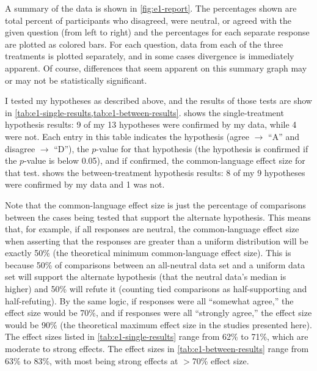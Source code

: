 \begin{table}[!p]
\centering
\bgroup
\def\arraystretch{1.3}
\setlength{\tabcolsep}{0.7em}

\egroup
\caption[Prospective between-treatment results]{%
Between-treatments results.
%
Each row indicates a hypothesis, the corresponding $p$-value, and the effect size if the result is significant ($p < 0.05$). Significant results are shown in bold; non-significant results are in \nsighcolor/.
}
  \label{tab:e1-between-results}
\end{table}


A summary of the data is shown in \cref{fig:e1-report}.
%
The percentages shown are total percent of participants who disagreed, were neutral, or agreed with the given question (from left to right) and the percentages for each separate response are plotted as colored bars.
%
For each question, data from each of the three treatments is plotted separately, and in some cases divergence is immediately apparent.
%
Of course, differences that seem apparent on this summary graph may or may not be statistically significant.


I tested my hypotheses as described above, and the results of those tests are show in \cref{tab:e1-single-results,tab:e1-between-results}.
%
 shows the single-treatment hypothesis results: 9 of my 13 hypotheses were confirmed by my data, while 4 were not.
%
Each entry in this table indicates the hypothesis (agree $\rightarrow$ ``A'' and disagree $\rightarrow$ ``D''), the $p$-value for that hypothesis (the hypothesis is confirmed if the $p$-value is below 0.05), and if confirmed, the common-language effect size for that test.
%
 shows the between-treatment hypothesis results: 8 of my 9 hypotheses were confirmed by my data and 1 was not.


Note that the common-language effect size is just the percentage of comparisons between the cases being tested that support the alternate hypothesis.
%
This means that, for example, if all responses are neutral, the common-language effect size when asserting that the responses are greater than a uniform distribution will be exactly 50\% (the theoretical minimum common-language effect size).
%
This is because 50\% of comparisons between an all-neutral data set and a uniform data set will support the alternate hypothesis (that the neutral data's median is higher) and 50\% will refute it (counting tied comparisons as half-supporting and half-refuting).
%
By the same logic, if responses were all ``somewhat agree,'' the effect size would be 70\%, and if responses were all ``strongly agree,'' the effect size would be 90\% (the theoretical maximum effect size in the studies presented here).
%
The effect sizes listed in \cref{tab:e1-single-results} range from 62\% to 71\%, which are moderate to strong effects.
%
The effect sizes in \cref{tab:e1-between-results} range from 63\% to 83\%, with most being strong effects at $>$70\% effect size.


